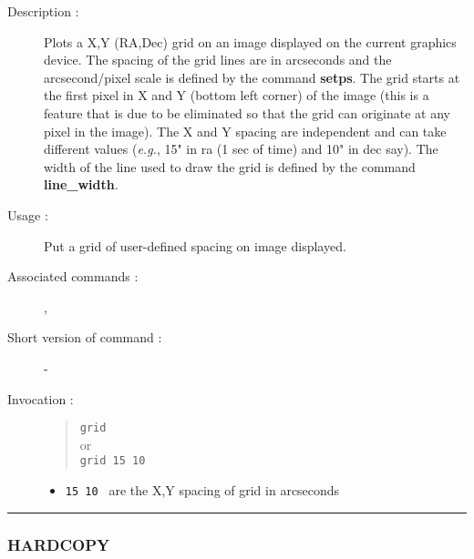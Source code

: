 \begin{description}

\item[Description :] Plots a X,Y (RA,Dec) grid on an image displayed on
the current graphics device.  The spacing of the grid lines are in
arcseconds and the arcsecond/pixel scale is defined by the command
{\bf setps}.  The grid starts at the first pixel in X and Y (bottom left
corner) of the image (this is a feature that is due to be eliminated so
that the grid can originate at any pixel in the image).  The X and Y
spacing are independent and can take different values (\emph{e.g.}, 15"
in ra (1 sec of time) and 10" in dec say).  The width of the line used
to draw the grid is defined by the command {\bf line\_width}.

\item[Usage :] Put a grid of user-defined spacing on image displayed.
\item[Associated commands :] {\tt {}}, 
{\tt {}}
\item[Short version of command :] -
\item[Invocation :]

\begin{quote}{\tt  grid }\\
or \\
{\tt grid 15 10 }
\end{quote}

\begin{itemize}

\item {\tt 15 10 } are the X,Y spacing of grid in arcseconds
\end{itemize}

\end{description}

\hrule 
\subsubsection*{\label{HARDCOPY}HARDCOPY}

